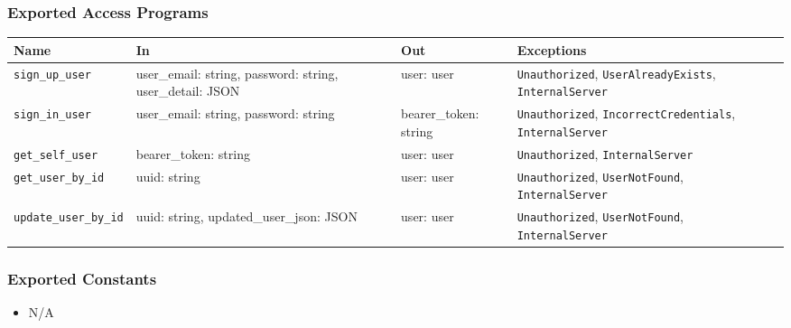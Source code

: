 \documentclass[12pt, titlepage]{article}
\begin{document}
\subsubsection{Exported Access Programs}
\begin{center}
\small
\renewcommand{\arraystretch}{1.5}
\begin{tabular}{|p{3.5cm}|p{3.5cm}|p{2.5cm}|p{4cm}|}
    \hline
    \textbf{Name} & \textbf{In} & \textbf{Out} & \textbf{Exceptions} \\
    \hline 
    \texttt{sign\_up\_user} & user\_email: string, \newline password: string, \newline user\_detail: JSON & user: user & \texttt{Unauthorized}, \newline \texttt{UserAlreadyExists}, \newline \texttt{InternalServer} \\
    \hline
    \texttt{sign\_in\_user} & user\_email: string, \newline password: string & bearer\_token: string & \texttt{Unauthorized}, \newline \texttt{IncorrectCredentials}, \newline \texttt{InternalServer} \\
    \hline
    \texttt{get\_self\_user} & bearer\_token: string & user: user & \texttt{Unauthorized}, \newline \texttt{InternalServer} \\
    \hline
    \texttt{get\_user\_by\_id} & uuid: string & user: user & \texttt{Unauthorized}, \newline \texttt{UserNotFound}, \newline \texttt{InternalServer} \\
    \hline
    \texttt{update\_user\_by\_id} & uuid: string, \newline updated\_user\_json: JSON & user: user & \texttt{Unauthorized}, \newline \texttt{UserNotFound}, \newline \texttt{InternalServer} \\
    \hline
\end{tabular}
\end{center}

\subsubsection{Exported Constants}
\begin{itemize}
    \item N/A
\end{itemize}
\end{document}
